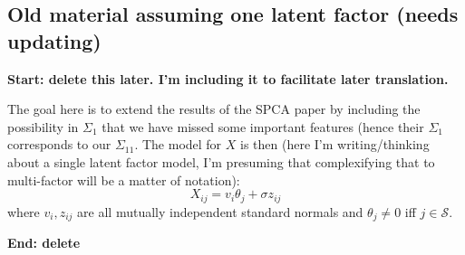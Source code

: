 \documentclass[11pt]{article}
\renewcommand{\S}{\mathcal{S}}
\begin{document}
\subsection{Old material assuming one latent factor (needs updating)}


\textbf{Start: delete this later.  I'm including it to facilitate later translation.}

The goal here is to extend the results of the SPCA paper by including the possibility in $\Sigma_1$ that we have missed some important features  (hence their $\Sigma_1$ corresponds 
to our $\Sigma_{11}$.  The model for $X$ is then (here I'm writing/thinking about a single latent factor model, I'm presuming that complexifying that to multi-factor will be a matter
of notation):
\[
X_{ij} = v_i \theta_j + \sigma z_{ij}
\]
where $v_i,z_{ij}$ are all mutually independent standard normals and $\theta_j \neq 0$ iff $j \in \S$.

\noindent\textbf{End: delete}
\end{document}
